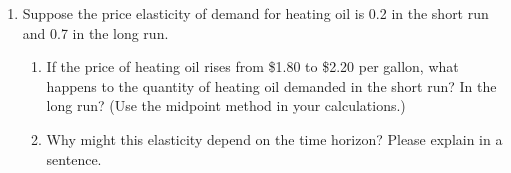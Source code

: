 \documentclass{article}
\begin{document}
\begin{enumerate}
\begin{enumerate}
	\end{enumerate}

\item Suppose the price elasticity of demand for heating oil is 0.2 in the short run and 0.7 in the long run.

	\begin{enumerate}
	
	\item If the price of heating oil rises from \$1.80 to \$2.20 per gallon, what happens to the quantity of heating oil demanded in the short run? In the long run? (Use the midpoint method in your calculations.)
	
	\item Why might this elasticity depend on the time horizon? Please explain in a sentence.
	
	\end{enumerate}

\end{enumerate}
\end{document}
